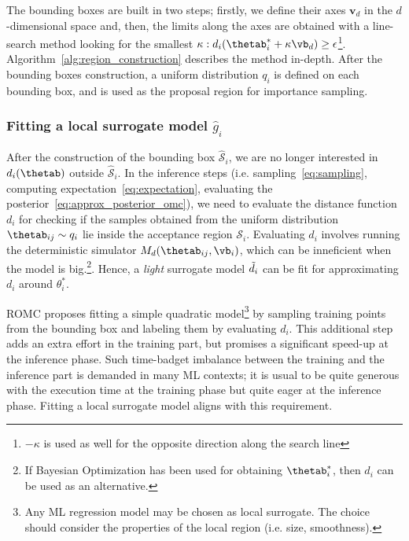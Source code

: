 The bounding boxes are built in two steps; firstly, we define their
axes $\mathbf{v}_d$ in the $d$-dimensional space and, then, the limits
along the axes are obtained with a line-search method looking for the
smallest
$\kappa: d_i(\thetab_i^* + \kappa \vb_d) \geq
\epsilon$\footnote{$-\kappa$ is used as well for the opposite
  direction along the search
  line}. Algorithm~\ref{alg:region_construction} describes the method
in-depth. After the bounding boxes construction, a uniform
distribution $q_i$ is defined on each bounding box, and is used as the
proposal region for importance sampling.

\subsubsection*{Fitting a local surrogate model $\hat{g}_i$}

After the construction of the bounding box $\mathcal{\hat{S}}_i$, we
are no longer interested in $d_i(\thetab)$ outside
$\mathcal{\hat{S}}_i$. In the inference steps
(i.e. sampling~\eqref{eq:sampling}, computing
expectation~\eqref{eq:expectation}, evaluating the
posterior~\eqref{eq:approx_posterior_omc}), we need to evaluate the
distance function $d_i$ for checking if the samples obtained from the
uniform distribution $\thetab_{ij} \sim q_i$ lie inside the acceptance
region $\mathcal{S}_i$. Evaluating $d_i$ involves running the
deterministic simulator $M_d(\thetab_{ij}, \vb_i)$, which can be
inneficient when the model is big.\footnote{If Bayesian Optimization
  has been used for obtaining $\thetab_i^*$, then $\hat{d}_i$ can be
  used as an alternative.}. Hence, a \emph{light} surrogate model
$\Tilde{d}_i$ can be fit for approximating $d_i$ around $\theta_i^*$.

ROMC proposes fitting a simple quadratic model\footnote{Any ML
  regression model may be chosen as local surrogate. The choice should
  consider the properties of the local region (i.e. size,
  smoothness). } by sampling training points from the bounding box and
labeling them by evaluating $d_i$. This additional step adds an extra
effort in the training part, but promises a significant speed-up at
the inference phase. Such time-badget imbalance between the training
and the inference part is demanded in many ML contexts; it is usual to
be quite generous with the execution time at the training phase but
quite eager at the inference phase. Fitting a local surrogate model
aligns with this requirement.
